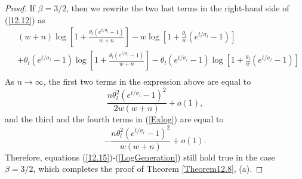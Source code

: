 \documentclass[12pt]{amsart}
\theoremstyle{definition}
\numberwithin{equation}{section}
\begin{document}
\begin{proof}
If $\beta=3/2$, then we rewrite the two last terms in the right-hand side of
(\ref{12.12}) as
\begin{equation}\label{Exlog}
\begin{split}
&(w+n)\log\left[1+\frac{\theta_l\left(e^{t/\sigma_l}-1\right)}{w+n}\right]-w
\log\left[1+\frac{\theta_l}{w}\left(e^{t/\sigma_l}-1\right)\right]\\
&+
\theta_l\left(e^{t/\sigma_l}-1\right)\log\left[1+\frac{\theta_l\left(e^{t/\sigma_l}-1\right)}{w+n}\right]
-\theta_l\left(e^{t/\sigma_l}-1\right)
\log\left[1+\frac{\theta_l}{w}\left(e^{t/\sigma_l}-1\right)\right]\\
\end{split}
\end{equation}
As $n\rightarrow\infty$, the first two terms in the expression above are equal to
$$
\frac{n\theta_l^2\left(e^{t/\sigma_l}-1\right)^2}{2w(w+n)} +o(1),
$$
and the third and the fourth terms  in (\ref{Exlog}) are equal to
$$
-\frac{n\theta_l^2\left(e^{t/\sigma_l}-1\right)^2}{w(w+n)} +o(1).
$$
Therefore, equations (\ref{12.15})-(\ref{LogGeneration})  still hold true
in the case $\beta=3/2$, which completes the proof of Theorem \ref{Theorem12.8}, (a).










\end{proof}
\end{document}
